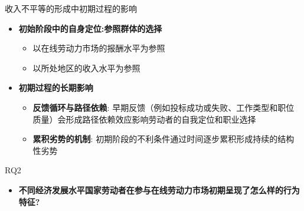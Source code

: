 \documentclass{beamer}
\begin{document}
    \begin{frame}{收入不平等的形成中初期过程的影响}{\secname}
    \begin{itemize}
    \pause
        \item \textbf{初始阶段中的自身定位:参照群体的选择}
        \begin{itemize}
            \item 以在线劳动力市场的报酬水平为参照
            \item 以所处地区的收入水平为参照
        \end{itemize}
        \pause
        \item \textbf{初期过程的长期影响}
        \begin{itemize}
            \item \textbf{反馈循环与路径依赖}: 早期反馈（例如投标成功或失败、工作类型和职位质量）会形成路径依赖效应影响劳动者的自我定位和职业选择
            \item \textbf{累积劣势的机制}: 初期阶段的不利条件通过时间逐步累积形成持续的结构性劣势
        \end{itemize}
    \end{itemize}
    \pause
    \begin{block}{RQ2}
        \begin{itemize}
            \item \textbf{不同经济发展水平国家劳动者在参与在线劳动力市场初期呈现了怎么样的行为特征?}
        \end{itemize}
    \end{block}
    \end{frame}    
    
\end{document}
